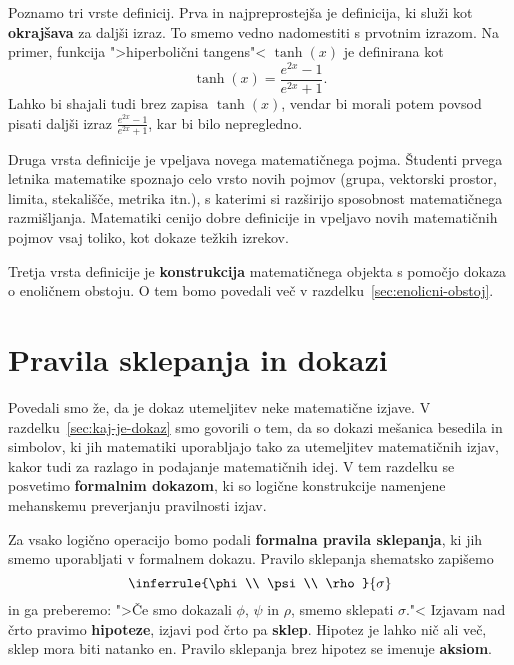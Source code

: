 Poznamo tri vrste definicij. Prva in najpreprostejša je definicija, ki
služi kot \textbf{okrajšava} za daljši izraz. To smemo vedno nadomestiti
s prvotnim izrazom. Na primer, funkcija ">hiperbolični tangens"<
$\tanh(x)$ je definirana kot
%
\begin{equation*}
  \tanh(x) = \frac{e^{2 x} - 1}{e^{2 x} + 1}.
\end{equation*}
%
Lahko bi shajali tudi brez zapisa $\tanh(x)$, vendar bi morali potem
povsod pisati daljši izraz $\frac{e^{2 x} - 1}{e^{2 x} + 1}$, kar bi
bilo nepregledno.

Druga vrsta definicije je vpeljava novega matematičnega pojma.
Študenti prvega letnika matematike spoznajo celo vrsto novih pojmov
(grupa, vektorski prostor, limita, stekališče, metrika itn.), s
katerimi si razširijo sposobnost matematičnega razmišljanja.
Matematiki cenijo dobre definicije in vpeljavo novih matematičnih
pojmov vsaj toliko, kot dokaze težkih izrekov.

Tretja vrsta definicije je \textbf{konstrukcija} matematičnega objekta s
pomočjo dokaza o enoličnem obstoju. O tem bomo povedali več v
razdelku~\ref{sec:enolicni-obstoj}.

\section{Pravila sklepanja in dokazi}
\label{sec:pravila-sklepanja-in-dokazi}


Povedali smo že, da je dokaz utemeljitev neke matematične izjave. V
razdelku~\ref{sec:kaj-je-dokaz} smo govorili o tem, da so dokazi
mešanica besedila in simbolov, ki jih matematiki uporabljajo tako za
utemeljitev matematičnih izjav, kakor tudi za razlago in podajanje
matematičnih idej. V tem razdelku se posvetimo \textbf{formalnim
  dokazom}, ki so logične konstrukcije namenjene mehanskemu
preverjanju pravilnosti izjav.

Za vsako logično operacijo bomo podali \textbf{formalna pravila
  sklepanja}, ki jih smemo uporabljati v formalnem dokazu. Pravilo
sklepanja shematsko zapišemo
%
\begin{equation*}
  \inferrule{\phi \\ \psi \\ \rho}{\sigma}
\end{equation*}
%
in ga preberemo: ">Če smo dokazali $\phi$, $\psi$ in $\rho$, smemo
sklepati $\sigma$."< Izjavam nad črto pravimo \textbf{hipoteze}, izjavi
pod črto pa \textbf{sklep}. Hipotez je lahko nič ali več, sklep mora
biti natanko en. Pravilo sklepanja brez hipotez se imenuje
\textbf{aksiom}.

